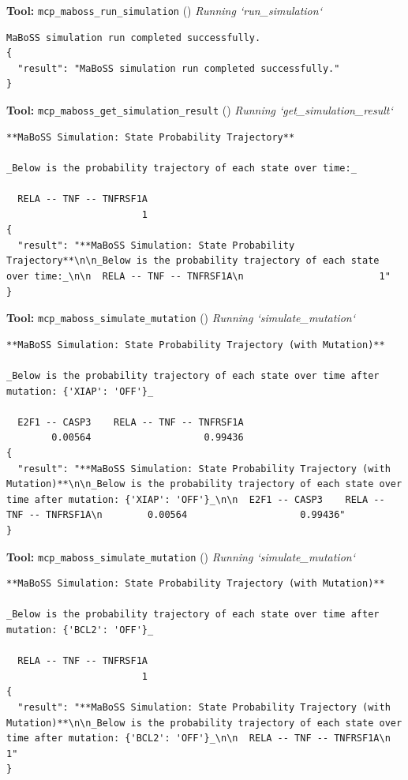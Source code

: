 \documentclass[11pt,a4paper]{article}
\begin{document}
\begin{toolokbox}
\textbf{Tool:} \texttt{mcp\_maboss\_run\_simulation} (\checkmark)
\textit{Running `run\_simulation`}
\begin{lstlisting}
MaBoSS simulation run completed successfully.
{
  "result": "MaBoSS simulation run completed successfully."
}
\end{lstlisting}
\end{toolokbox}
\begin{toolokbox}
\textbf{Tool:} \texttt{mcp\_maboss\_get\_simulation\_result} (\checkmark)
\textit{Running `get\_simulation\_result`}
\begin{lstlisting}
**MaBoSS Simulation: State Probability Trajectory**

_Below is the probability trajectory of each state over time:_

  RELA -- TNF -- TNFRSF1A
                        1
{
  "result": "**MaBoSS Simulation: State Probability Trajectory**\n\n_Below is the probability trajectory of each state over time:_\n\n  RELA -- TNF -- TNFRSF1A\n                        1"
}
\end{lstlisting}
\end{toolokbox}
\begin{toolokbox}
\textbf{Tool:} \texttt{mcp\_maboss\_simulate\_mutation} (\checkmark)
\textit{Running `simulate\_mutation`}
\begin{lstlisting}
**MaBoSS Simulation: State Probability Trajectory (with Mutation)**

_Below is the probability trajectory of each state over time after mutation: {'XIAP': 'OFF'}_

  E2F1 -- CASP3    RELA -- TNF -- TNFRSF1A
        0.00564                    0.99436
{
  "result": "**MaBoSS Simulation: State Probability Trajectory (with Mutation)**\n\n_Below is the probability trajectory of each state over time after mutation: {'XIAP': 'OFF'}_\n\n  E2F1 -- CASP3    RELA -- TNF -- TNFRSF1A\n        0.00564                    0.99436"
}
\end{lstlisting}
\end{toolokbox}
\begin{toolokbox}
\textbf{Tool:} \texttt{mcp\_maboss\_simulate\_mutation} (\checkmark)
\textit{Running `simulate\_mutation`}
\begin{lstlisting}
**MaBoSS Simulation: State Probability Trajectory (with Mutation)**

_Below is the probability trajectory of each state over time after mutation: {'BCL2': 'OFF'}_

  RELA -- TNF -- TNFRSF1A
                        1
{
  "result": "**MaBoSS Simulation: State Probability Trajectory (with Mutation)**\n\n_Below is the probability trajectory of each state over time after mutation: {'BCL2': 'OFF'}_\n\n  RELA -- TNF -- TNFRSF1A\n                        1"
}
\end{lstlisting}
\end{toolokbox}
\end{document}

